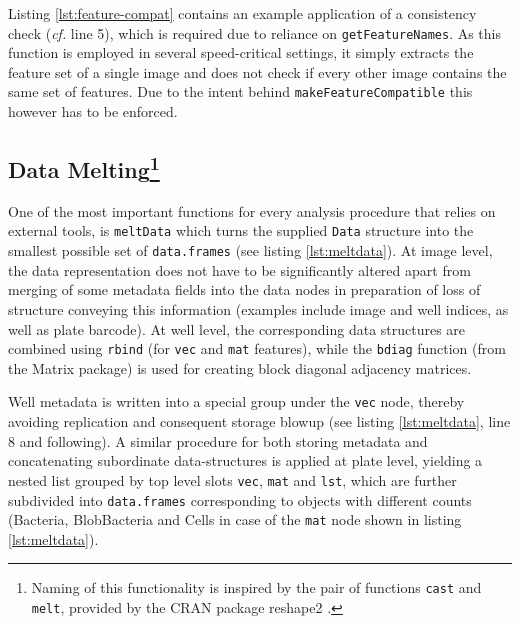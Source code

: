 Listing \ref{lst:feature-compat} contains an example application of a consistency check (\textit{cf.} line 5), which is required due to reliance on \texttt{getFeatureNames}. As this function is employed in several speed-critical settings, it simply extracts the feature set of a single image and does not check if every other image contains the same set of features. Due to the intent behind \texttt{makeFeatureCompatible} this however has to be enforced.

\subsection{Data Melting\footnote{Naming of this functionality is inspired by the pair of functions \texttt{cast} and \texttt{melt}, provided by the CRAN package reshape2 \citep{Wickham2007}.}}
One of the most important functions for every analysis procedure that relies on external tools, is \texttt{meltData} which turns the supplied \texttt{Data} structure into the smallest possible set of \texttt{data.frames} (see listing \ref{lst:meltdata}). At image level, the data representation does not have to be significantly altered apart from merging of some metadata fields into the data nodes in preparation of loss of structure conveying this information (examples include image and well indices, as well as plate barcode). At well level, the corresponding data structures are combined using \texttt{rbind} (for \texttt{vec} and \texttt{mat} features), while the \texttt{bdiag} function (from the Matrix package) is used for creating block diagonal adjacency matrices.

Well metadata is written into a special group under the \texttt{vec} node, thereby avoiding replication and consequent storage blowup (see listing \ref{lst:meltdata}, line 8 and following). A similar procedure for both storing metadata and concatenating subordinate data-structures is applied at plate level, yielding a nested list grouped by top level slots \texttt{vec}, \texttt{mat} and \texttt{lst}, which are further subdivided into \texttt{data.frames} corresponding to objects with different counts (Bacteria, BlobBacteria and Cells in case of the \texttt{mat} node shown in listing \ref{lst:meltdata}).


